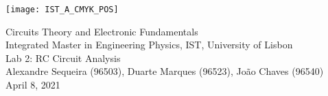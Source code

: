 \thispagestyle {empty}

\texttt{[image: IST\_A\_CMYK\_POS]}

\begin{center}

\vspace{1.0cm}

\vspace{1cm}
{\FontLb Circuits Theory and Electronic Fundamentals} \\ 
\vspace{0.5cm}
{\FontSn Integrated Master in Engineering Physics, IST, University of Lisbon} \\
\vspace{0.5cm}
{\FontSn Lab 2: RC Circuit Analysis} \\
\vspace{0.2cm}
{\FontSn Alexandre Sequeira (96503), Duarte Marques (96523), João Chaves (96540)} \\
\vspace{0.2cm}
{\FontSn April 8, 2021} \\ %
%
\end{center}

